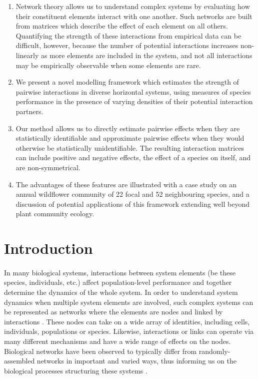 \documentclass[a4,12pt]{article}
\begin{document}
    \begin{enumerate}
    \item{Network theory allows us to understand complex systems by evaluating how their constituent elements interact with one another. Such networks are built from matrices which describe the effect of each element on all others. Quantifying the strength of these interactions from empirical data can be difficult, however, because the number of potential interactions increases non-linearly as more elements are included in the system, and not all interactions may be empirically observable when some elements are rare.}
    \item{We present a novel modelling framework which estimates the strength of pairwise interactions in diverse horizontal systems, using measures of species performance in the presence of varying densities of their potential interaction partners.}
    \item{Our method allows us to directly estimate pairwise effects when they are statistically identifiable and approximate pairwise effects when they would otherwise be statistically unidentifiable. The resulting interaction matrices can include positive and negative effects, the effect of a species on itself, and are non-symmetrical.} 
    \item{The advantages of these features are illustrated with a case study on an annual wildflower community of 22 focal and 52 neighbouring species, and a discussion of potential applications of this framework extending well beyond plant community ecology.}
\end{enumerate}

\section{Introduction}

    
    \paragraph{}
    In many biological systems, interactions between system elements (be these species, individuals, etc.) affect population-level performance and together determine the dynamics of the whole system. In order to understand system dynamics when multiple system elements are involved, such complex systems can be represented as networks where the elements are nodes and linked by interactions \parencite{Pimm1978}. These nodes can take on a wide array of identities, including cells, individuals, populations or species. Likewise, interactions or links can operate via many different mechanisms and have a wide range of effects on the nodes. Biological networks have been observed to typically differ from randomly-assembled networks in important and varied ways, thus informing us on the biological processes structuring these systems \parencite{Dunne2002, Kinlock2019}.
\end{document}
